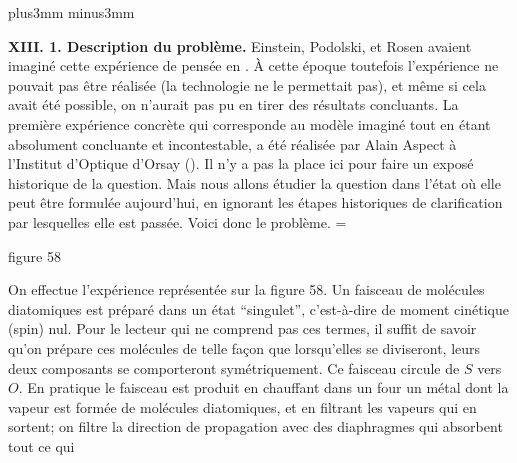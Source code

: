 \vskip6mm plus3mm minus3mm 

{\bf XIII. 1. Description du probl\`eme.}
\medskip
Einstein, Podolski, et Rosen avaient imagin\'e cette exp\'erience de 
pens\'ee en {} . \`A cette  
\'epoque toutefois l'exp\'erience ne pouvait pas \^etre r\'ealis\'ee (la 
technologie ne  le permettait pas), et m\^eme si cela avait \'et\'e 
possible, on n'aurait pas pu en tirer des r\'esultats  concluants. La 
premi\`ere exp\'erience concr\`ete qui corresponde au mod\`ele  
imagin\'e tout en \'etant  absolument  concluante et incontestable, a 
\'et\'e r\'ealis\'ee par Alain Aspect \`a l'Institut d'Optique d'Orsay 
({}). Il n'y a pas la place ici  pour faire un expos\'e 
historique de la question. 
Mais nous allons \'etudier la 
question dans  l'\'etat o\`u elle peut \^etre formul\'ee aujourd'hui, en 
ignorant les \'etapes historiques de clarification par lesquelles elle  
est pass\'ee. Voici donc le probl\`eme.    
\medskip 
\midinsert  
\epsfxsize=\hsize
{} 
\centerline{\eightpoint figure 58} 
\endinsert 
On effectue l'exp\'erience repr\'esent\'ee sur la figure 58. Un faisceau 
de mol\'ecules diatomiques est pr\'epar\'e dans un \'etat ``singulet'',
c'est-\`a-dire de moment cin\'etique (spin) nul. Pour le lecteur qui
ne comprend pas ces termes, il suffit de savoir qu'on pr\'epare ces 
mol\'ecules de telle fa\c{c}on que lorsqu'elles se diviseront, leurs deux
composants se comporteront sym\'etriquement. Ce faisceau circule de 
$S$ vers $O$. En pratique le faisceau est produit en chauffant dans un 
four un m\'etal dont la vapeur est form\'ee de mol\'ecules diatomiques,
et en filtrant les vapeurs qui en sortent; on filtre la
direction de propagation avec des diaphragmes qui absorbent tout ce qui
